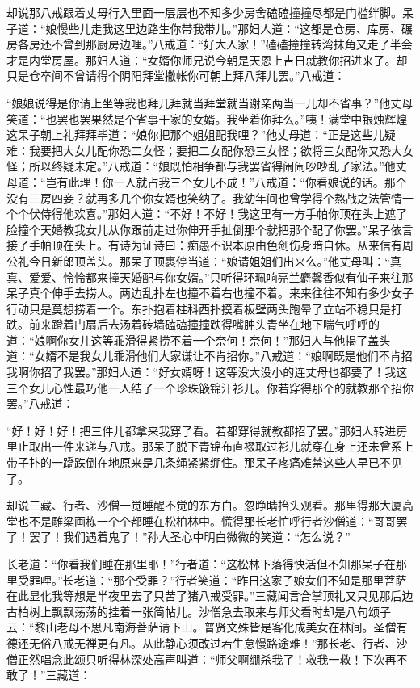 \documentclass[12pt,UTF8]{ctexbook}
\begin{document}
{却说那八戒跟着丈母行入里面一层层也不知多少房舍磕磕撞撞尽都是门槛绊脚。呆子道：“娘慢些儿走我这里边路生你带我带儿。”那妇人道：“这都是仓房、库房、碾房各房还不曾到那厨房边哩。”八戒道：“好大人家！”磕磕撞撞转湾抹角又走了半会才是内堂房屋。那妇人道：“女婿你师兄说今朝是天恩上吉日就教你招进来了。却只是仓卒间不曾请得个阴阳拜堂撒帐你可朝上拜八拜儿罢。”八戒道：

“娘娘说得是你请上坐等我也拜几拜就当拜堂就当谢亲两当一儿却不省事？”他丈母笑道：“也罢也罢果然是个省事干家的女婿。我坐着你拜么。”咦！满堂中银烛辉煌这呆子朝上礼拜拜毕道：“娘你把那个姐姐配我哩？”他丈母道：“正是这些儿疑难：我要把大女儿配你恐二女怪；要把二女配你恐三女怪；欲将三女配你又恐大女怪；所以终疑未定。”八戒道：“娘既怕相争都与我罢省得闹闹吵吵乱了家法。”他丈母道：“岂有此理！你一人就占我三个女儿不成！”八戒道：“你看娘说的话。那个没有三房四妾？就再多几个你女婿也笑纳了。我幼年间也曾学得个熬战之法管情一个个伏侍得他欢喜。”那妇人道：“不好！不好！我这里有一方手帕你顶在头上遮了脸撞个天婚教我女儿从你跟前走过你伸开手扯倒那个就把那个配了你罢。”呆子依言接了手帕顶在头上。有诗为证诗曰：痴愚不识本原由色剑伤身暗自休。从来信有周公礼今日新郎顶盖头。那呆子顶裹停当道：“娘请姐姐们出来么。”他丈母叫：“真真、爱爱、怜怜都来撞天婚配与你女婿。”只听得环珮响亮兰麝馨香似有仙子来往那呆子真个伸手去捞人。两边乱扑左也撞不着右也撞不着。来来往往不知有多少女子行动只是莫想捞着一个。东扑抱着柱科西扑摸着板壁两头跑晕了立站不稳只是打跌。前来蹬着门扇后去汤着砖墙磕磕撞撞跌得嘴肿头青坐在地下喘气呼呼的道：“娘啊你女儿这等乖滑得紧捞不着一个奈何！奈何！”那妇人与他揭了盖头道：“女婿不是我女儿乖滑他们大家谦让不肯招你。”八戒道：“娘啊既是他们不肯招我啊你招了我罢。”那妇人道：“好女婿呀！这等没大没小的连丈母也都要了！我这三个女儿心性最巧他一人结了一个珍珠篏锦汗衫儿。你若穿得那个的就教那个招你罢。”八戒道：

“好！好！好！把三件儿都拿来我穿了看。若都穿得就教都招了罢。”那妇人转进房里止取出一件来递与八戒。那呆子脱下青锦布直裰取过衫儿就穿在身上还未曾系上带子扑的一蹻跌倒在地原来是几条绳紧紧绷住。那呆子疼痛难禁这些人早已不见了。

却说三藏、行者、沙僧一觉睡醒不觉的东方白。忽睁睛抬头观看。那里得那大厦高堂也不是雕梁画栋一个个都睡在松柏林中。慌得那长老忙呼行者沙僧道：“哥哥罢了！罢了！我们遇着鬼了！”孙大圣心中明白微微的笑道：“怎么说？”

长老道：“你看我们睡在那里耶！”行者道：“这松林下落得快活但不知那呆子在那里受罪哩。”长老道：“那个受罪？”行者笑道：“昨日这家子娘女们不知是那里菩萨在此显化我等想是半夜里去了只苦了猪八戒受罪。”三藏闻言合掌顶礼又只见那后边古柏树上飘飘荡荡的挂着一张简帖儿。沙僧急去取来与师父看时却是八句颂子云：“黎山老母不思凡南海菩萨请下山。普贤文殊皆是客化成美女在林间。圣僧有德还无俗八戒无禅更有凡。从此静心须改过若生怠慢路途难！”那长老、行者、沙僧正然唱念此颂只听得林深处高声叫道：“师父啊绷杀我了！救我一救！下次再不敢了！”三藏道：

}
\end{document}
